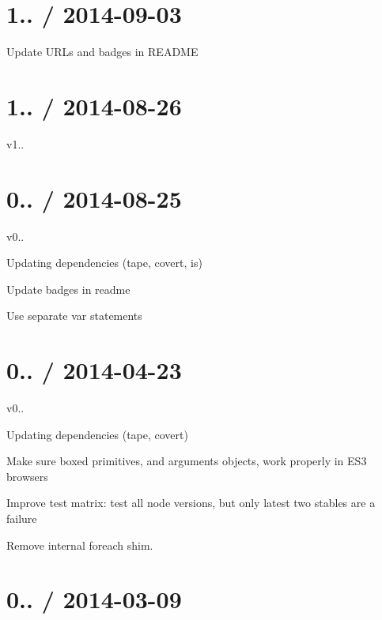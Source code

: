 \section*{1.. / 2014-\/09-\/03 }


\begin{DoxyItemize}
\item Update U\+R\+Ls and badges in R\+E\+A\+D\+ME
\end{DoxyItemize}

\section*{1.. / 2014-\/08-\/26 }


\begin{DoxyItemize}
\item v1..
\end{DoxyItemize}

\section*{0.. / 2014-\/08-\/25 }


\begin{DoxyItemize}
\item v0..
\item Updating dependencies (tape, covert, is)
\item Update badges in readme
\item Use separate var statements
\end{DoxyItemize}

\section*{0.. / 2014-\/04-\/23 }


\begin{DoxyItemize}
\item v0..
\item Updating dependencies (tape, covert)
\item Make sure boxed primitives, and arguments objects, work properly in E\+S3 browsers
\item Improve test matrix\+: test all node versions, but only latest two stables are a failure
\item Remove internal foreach shim.
\end{DoxyItemize}

\section*{0.. / 2014-\/03-\/09 }


